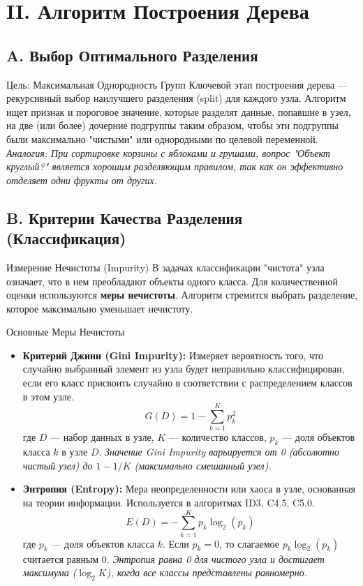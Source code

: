 \section{II. Алгоритм Построения Дерева}

\subsection{A. Выбор Оптимального Разделения}
\begin{myblock}{Цель: Максимальная Однородность Групп}
    Ключевой этап построения дерева — рекурсивный выбор наилучшего разделения (split) для каждого узла. Алгоритм ищет признак и пороговое значение, которые разделят данные, попавшие в узел, на две (или более) дочерние подгруппы таким образом, чтобы эти подгруппы были максимально "чистыми" или однородными по целевой переменной.
    \textit{Аналогия: При сортировке корзины с яблоками и грушами, вопрос "Объект круглый?" является хорошим разделяющим правилом, так как он эффективно отделяет одни фрукты от других.}
\end{myblock}

\subsection{B. Критерии Качества Разделения (Классификация)}
\begin{textbox}{Измерение Нечистоты (Impurity)}
    В задачах классификации "чистота" узла означает, что в нем преобладают объекты одного класса. Для количественной оценки используются \textbf{меры нечистоты}. Алгоритм стремится выбрать разделение, которое максимально уменьшает нечистоту.
\end{textbox}

\begin{myexampleblock}{Основные Меры Нечистоты}
    \begin{itemize}[nosep, leftmargin=*]
        \item \textbf{Критерий Джини (Gini Impurity):} \newline
        Измеряет вероятность того, что случайно выбранный элемент из узла будет неправильно классифицирован, если его класс присвоить случайно в соответствии с распределением классов в этом узле.
        \[ G(D) = 1 - \sum_{k=1}^{K} p_k^2 \]
        где $D$ — набор данных в узле, $K$ — количество классов, $p_k$ — доля объектов класса $k$ в узле $D$.
        \textit{Значение Gini Impurity варьируется от 0 (абсолютно чистый узел) до $1 - 1/K$ (максимально смешанный узел).}

        \item \textbf{Энтропия (Entropy):} \newline
        Мера неопределенности или хаоса в узле, основанная на теории информации. Используется в алгоритмах ID3, C4.5, C5.0.
        \[ E(D) = - \sum_{k=1}^{K} p_k \log_2(p_k) \]
        где $p_k$ — доля объектов класса $k$. Если $p_k = 0$, то слагаемое $p_k \log_2(p_k)$ считается равным 0.
        \textit{Энтропия равна 0 для чистого узла и достигает максимума ($\log_2 K$), когда все классы представлены равномерно.}
    \end{itemize}
\end{myexampleblock}

